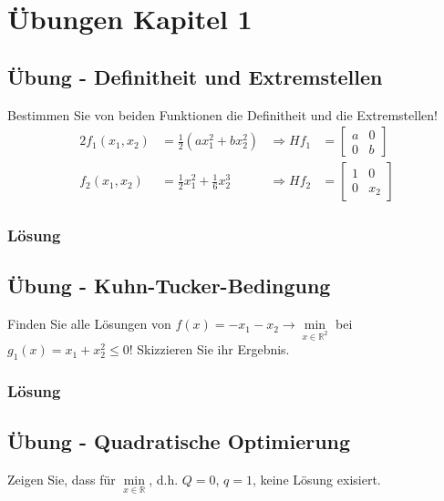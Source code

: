 \section*{Übungen Kapitel 1}
\label{sec:uebung_kapitel_1}

\subsection*{Übung - Definitheit und Extremstellen}
\label{sec:uebung_kapitel_1_def_extrem} 
Bestimmen Sie von beiden Funktionen die Definitheit und die Extremstellen!
\begin{alignat*}{2}
f_1(x_1,x_2) & = \frac12\left(ax_1^2+bx_2^2\right) &\Rightarrow H f_1&=\begin{bmatrix} a & 0\\ 0 & b \end{bmatrix}\\
f_2(x_1,x_2) & = \frac12x_1^2+\frac16x_2^3 & \Rightarrow H f_2&=\begin{bmatrix} 1 & 0\\ 0 & x_2 \end{bmatrix}
\end{alignat*}

\subsubsection{Lösung}
 
\subsection*{Übung - Kuhn-Tucker-Bedingung}
\label{sec:uebung_kapitel_1_ktb} 
Finden Sie alle Lösungen von $f(x)=-x_1-x_2\rightarrow\min\limits_{x\in\mathbb{R}^2}$ bei $g_1(x)=x_1+x_2^2\le 0$! Skizzieren Sie ihr Ergebnis.

\subsubsection{Lösung} 

\subsection*{Übung - Quadratische Optimierung}
\label{sec:uebung_kapitel_1_quadopt} 
Zeigen Sie, dass für $\min\limits_{x\in\mathbb{R}}$, d.h. $Q=0$, $q=1$, keine Lösung exisiert.

